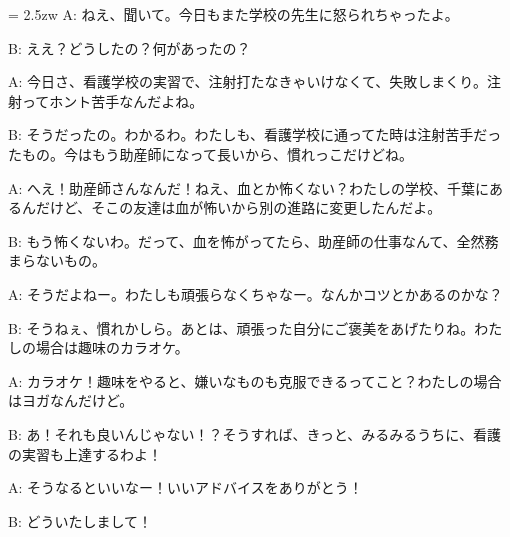 \documentclass[11pt]{amsart}
\title{}
\author{}
\newenvironment{hangall}[1]{\hangindent = 2.5zw\everypar{\hangindent = 2.5zw}}{}
\begin{document}
\maketitle
\begin{hangall}{}%
A: ねえ、聞いて。今日もまた学校の先生に怒られちゃったよ。



B: ええ？どうしたの？何があったの？



A: 今日さ、看護学校の実習で、注射打たなきゃいけなくて、失敗しまくり。注射ってホント苦手なんだよね。



B: そうだったの。わかるわ。わたしも、看護学校に通ってた時は注射苦手だったもの。今はもう助産師になって長いから、慣れっこだけどね。



A: へえ！助産師さんなんだ！ねえ、血とか怖くない？わたしの学校、千葉にあるんだけど、そこの友達は血が怖いから別の進路に変更したんだよ。



B: もう怖くないわ。だって、血を怖がってたら、助産師の仕事なんて、全然務まらないもの。



A: そうだよねー。わたしも頑張らなくちゃなー。なんかコツとかあるのかな？



B: そうねぇ、慣れかしら。あとは、頑張った自分にご褒美をあげたりね。わたしの場合は趣味のカラオケ。



A: カラオケ！趣味をやると、嫌いなものも克服できるってこと？わたしの場合はヨガなんだけど。



B: あ！それも良いんじゃない！？そうすれば、きっと、みるみるうちに、看護の実習も上達するわよ！



A: そうなるといいなー！いいアドバイスをありがとう！



B: どういたしまして！\end{hangall}
\end{document}

